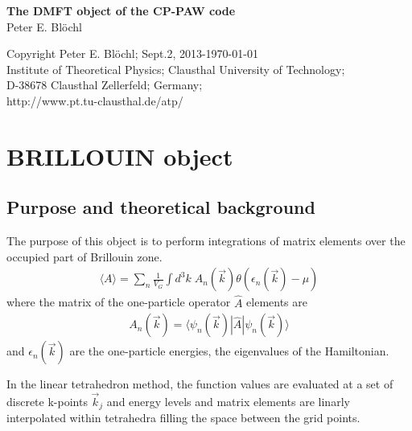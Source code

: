 \documentclass[11pt,a4paper]{report}
\begin{document}
\begin{titlepage}
\begin{center}
\vspace*{3.5cm}
{\huge \textbf{The DMFT object of the CP-PAW code}}\\
\vspace{0.5cm}
{\large Peter E. Bl\"ochl}
\vspace{0.5cm} 
\end{center}

\vfill
\begin{center}
Copyright Peter E. Bl\"ochl; Sept.2, 2013-\today\\
{\small
Institute of Theoretical Physics;
Clausthal University of Technology;\\ 
D-38678 Clausthal Zellerfeld; Germany;\\
http://www.pt.tu-clausthal.de/atp/}
\end{center}
\end{titlepage}
\noindent            
\tableofcontents
\chapter{BRILLOUIN object}
\section{Purpose and theoretical background}
The purpose of this object is to perform integrations of matrix
elements over the occupied part of Brillouin zone.
\begin{eqnarray}
\langle A\rangle=\sum_n \frac{1}{V_G}\int d^3k\;
A_n(\vec{k})\theta(\epsilon_n(\vec{k})-\mu)
\end{eqnarray}
where the matrix of the one-particle operator $\hat{A}$ elements are
\begin{eqnarray}
A_n(\vec{k})=\langle\psi_n(\vec{k})|\hat{A}|\psi_n(\vec{k})\rangle
\end{eqnarray}
and $\epsilon_n(\vec{k})$ are the one-particle energies, the
eigenvalues of the Hamiltonian.

In the linear tetrahedron method\cite{jepsen71_ssc9_1763,
  lehmann72_pssb54_469, bloechl94_prb49_16223}, the function values
are evaluated at a set of discrete k-points $\vec{k}_j$ and energy
levels and matrix elements are linarly interpolated within tetrahedra
filling the space between the grid points.
\end{document}
